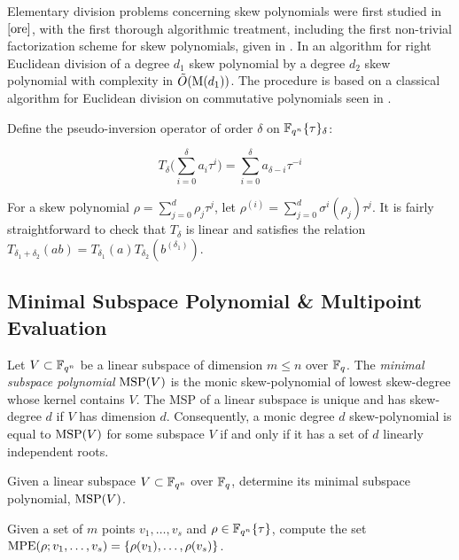Elementary division problems concerning skew polynomials were first studied in $\cite{ore}$, with the first thorough algorithmic treatment, including the first non-trivial factorization scheme for skew polynomials, given in \cite{GIESBRECHT1998463}. In \cite{CaLe17} an algorithm for right Euclidean division of a degree $d_1$ skew polynomial by a degree $d_2$ skew polynomial with complexity in $\tilde{O}(\textnormal{M}(d_1))$. The procedure is based on a classical algorithm for Euclidean division on commutative polynomials seen in \cite{Gathen:2003:MCA:945759}. 

Define the pseudo-inversion operator of order $\delta$ on $\mathbb{F}_{q^n}\{\tau\}_{\delta}$:

\begin{equation}
    T_{\delta}\bigg(\sum_{i=0}^{\delta} a_i \tau^i \bigg) = \sum_{i=0}^{\delta} a_{\delta - i} \tau^{-i}
\end{equation}

For a skew polynomial $\rho = \sum_{j=0}^{d}\rho_j\tau^j$, let $\rho^{(i)} = \sum_{j=0}^{d}\sigma^i(\rho_j)\tau^j$. It is fairly straightforward to check that $T_{\delta}$ is linear and satisfies the relation $T_{\delta_1 + \delta_2}(ab) = T_{\delta_1}(a)T_{\delta_2}(b^{(\delta_1)})$.


\subsection{Minimal Subspace Polynomial \& Multipoint Evaluation}

Let $V \subset \mathbb{F}_{q^n}$ be a linear subspace of dimension $m \leq n$ over $\mathbb{F}_q$. The \textit{minimal subspace polynomial} $\textnormal{MSP}(V)$ is the monic skew-polynomial of lowest skew-degree whose kernel contains $V$. The MSP of a linear subspace is unique and has skew-degree $d$ if $V$ has dimension $d$. Consequently, a monic degree $d$ skew-polynomial is equal to $\textnormal{MSP}(V)$ for some subspace $V$ if and only if it has a set of $d$ linearly independent roots. 

\begin{problem}
Given a linear subspace $V \subset \mathbb{F}_{q^n}$ over $\mathbb{F}_q$, determine its minimal subspace polynomial, $\textnormal{MSP}(V)$.
\end{problem}

\begin{problem}
Given a set of $m$ points $v_1, \ldots, v_s$ and $\rho \in \mathbb{F}_{q^n}\{\tau\}$, compute the set $\textnormal{MPE}(\rho; v_1, \ldots, v_s) = \{ \rho(v_1), \ldots, \rho(v_s) \}$.
\end{problem}

